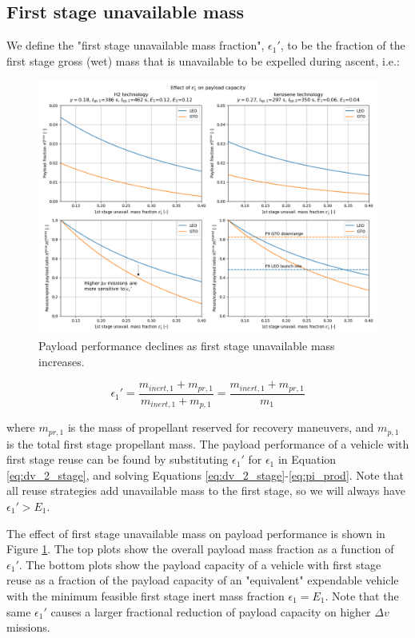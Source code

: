 \documentclass{iaf-iac}
\begin{document}
\begin{multicols}{2}
\subsection{First stage unavailable mass} \label{sec:unavail_mass}
We define the "first stage unavailable mass fraction", $\epsilon_1'$, to be the fraction of the first stage gross (wet) mass that is unavailable to be expelled during ascent, i.e.:

\begin{figure}
    \centering
    \includegraphics[width=\textwidth]{payload_vs_unavail_mass_annotated}
    \caption{\label{fig:payload_vs_unavail_mass} Payload performance declines as first stage unavailable mass increases.}
\end{figure}

\begin{equation}
\label{eq:epsilon_1_prime}
\epsilon_1' = \frac{m_{inert,1} + m_{pr,1}}{m_{inert,1} + m_{p,1}} = \frac{m_{inert,1} + m_{pr,1}}{m_1}
\end{equation}

where $m_{pr,1}$ is the mass of propellant reserved for recovery maneuvers, and $m_{p,1}$ is the total first stage propellant mass.
The payload performance of a vehicle with first stage reuse can be found by substituting $\epsilon_1'$ for $\epsilon_1$ in Equation \ref{eq:dv_2_stage}, and solving Equations \ref{eq:dv_2_stage}-\ref{eq:pi_prod}. Note that all reuse strategies add unavailable mass to the first stage, so we will always have $\epsilon_1' > E_1$.


The effect of first stage unavailable mass on payload performance is shown in Figure \ref{fig:payload_vs_unavail_mass}. The top plots show the overall payload mass fraction as a function of $\epsilon_1'$. The bottom plots show the payload capacity of a vehicle with first stage reuse as a fraction of the payload capacity of an "equivalent" expendable vehicle with the minimum feasible first stage inert mass fraction $\epsilon_1 = E_1$. Note that the same $\epsilon_1'$ causes a larger fractional reduction of payload capacity on higher $\Delta v$ missions.


\end{multicols}
\end{document}
